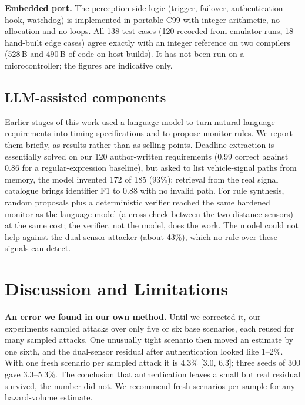 \documentclass[conference]{IEEEtran}
\begin{document}
\textbf{Embedded port.} The perception-side logic (trigger, failover, authentication hook, watchdog) is implemented in portable C99 with integer arithmetic, no allocation and no loops. All 138 test cases (120 recorded from emulator runs, 18 hand-built edge cases) agree exactly with an integer reference on two compilers (528\,B and 490\,B of code on host builds). It has not been run on a microcontroller; the figures are indicative only.

\subsection{LLM-assisted components}
Earlier stages of this work used a language model to turn natural-language requirements into timing specifications and to propose monitor rules. We report them briefly, as results rather than as selling points. Deadline extraction is essentially solved on our 120 author-written requirements (0.99 correct against 0.86 for a regular-expression baseline), but asked to list vehicle-signal paths from memory, the model invented 172 of 185 (93\%); retrieval from the real signal catalogue brings identifier F1 to 0.88 with no invalid path. For rule synthesis, random proposals plus a deterministic verifier reached the same hardened monitor as the language model (a cross-check between the two distance sensors) at the same cost; the verifier, not the model, does the work. The model could not help against the dual-sensor attacker (about 43\%), which no rule over these signals can detect.

\section{Discussion and Limitations}
\label{sec:limits}
\textbf{An error we found in our own method.} Until we corrected it, our experiments sampled attacks over only five or six base scenarios, each reused for many sampled attacks. One unusually tight scenario then moved an estimate by one sixth, and the dual-sensor residual after authentication looked like 1--2\%. With one fresh scenario per sampled attack it is 4.3\% [3.0, 6.3]; three seeds of 300 gave 3.3--5.3\%. The conclusion that authentication leaves a small but real residual survived, the number did not. We recommend fresh scenarios per sample for any hazard-volume estimate.
\end{document}
